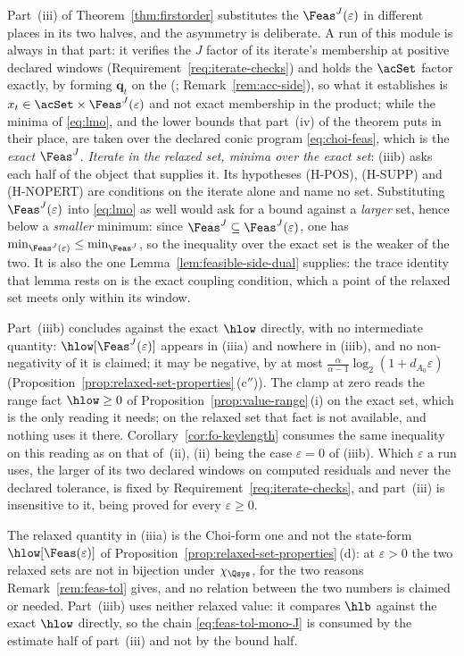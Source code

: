 \begin{remark}\label{rem:iterate-relaxed-oracle-exact}
Part~(iii) of Theorem~\ref{thm:firstorder} substitutes the
 $\Feas^{J}(\varepsilon)$ in different places
in its two halves, and the asymmetry is deliberate. A run of this module
is always in that part: it verifies the $J$ factor of its iterate's
membership at positive declared windows
(Requirement~\ref{req:iterate-checks}) and holds the $\acSet$ factor
exactly, by forming $\mathbf q_t$ on the 
(; Remark~\ref{rem:acc-side}), so what
it establishes is $x_t\in\acSet\times\Feas^{J}(\varepsilon)$ and not exact
membership in the product; while the minima of \eqref{eq:lmo}, and the
lower bounds that part~(iv) of the theorem puts in their place, are taken
over the declared conic program \eqref{eq:choi-feas}, which is the
\emph{exact} $\Feas^{J}$. \emph{Iterate in the relaxed set, minima over
the exact set}: (iiib) asks each half of the object that supplies it. Its
hypotheses (H-POS), (H-SUPP) and (H-NOPERT) are conditions on the iterate
alone and name no set. Substituting $\Feas^{J}(\varepsilon)$ into
\eqref{eq:lmo} as well would ask for a bound against a \emph{larger} set,
hence below a \emph{smaller} minimum: since
$\Feas^{J}\subseteq\Feas^{J}(\varepsilon)$, one has
$\min_{\Feas^{J}(\varepsilon)}\le\min_{\Feas^{J}}$, so the inequality over
the exact set is the weaker of the two. It is also the one
Lemma~\ref{lem:feasible-side-dual} supplies: the trace identity that lemma
rests on is the exact coupling condition, which a point of the relaxed set
meets only within its window.

Part~(iiib) concludes against the exact $\hlow$ directly, with no
intermediate quantity: $\hlow[\Feas^{J}(\varepsilon)]$ appears in (iiia)
and nowhere in (iiib), and no non-negativity of it is claimed; it may be
negative, by at most $\frac{\alpha}{\alpha-1}\log_2(1+d_{A_0}\varepsilon)$
(Proposition~\ref{prop:relaxed-set-properties}\,(c$''$)). The clamp at
zero reads the range fact $\hlow\ge0$ of
Proposition~\ref{prop:value-range}\,(i) on the exact set, which is the only
reading it needs; on the relaxed set that fact is not available, and
nothing uses it there. Corollary~\ref{cor:fo-keylength} consumes the same
inequality on this reading as on that of~(ii), (ii) being the case
$\varepsilon=0$ of (iiib). Which $\varepsilon$ a run uses, the larger of
its two declared windows on computed residuals and never the declared
tolerance, is fixed by Requirement~\ref{req:iterate-checks}, and part~(iii)
is insensitive to it, being proved for every $\varepsilon\ge0$.

The relaxed quantity in (iiia) is the Choi-form one and not the state-form
$\hlow[\Feas(\varepsilon)]$ of
Proposition~\ref{prop:relaxed-set-properties}\,(d): at $\varepsilon>0$ the
two relaxed sets are not in bijection under $\chi_{\Qsys}$, for the two
reasons Remark~\ref{rem:feas-tol} gives, and no relation between the two
numbers is claimed or needed. Part~(iiib) uses neither relaxed value: it
compares $\hlb$ against the exact $\hlow$ directly, so the chain
\eqref{eq:feas-tol-mono-J} is consumed by the estimate half of part~(iii)
and not by the bound half.
\end{remark}
